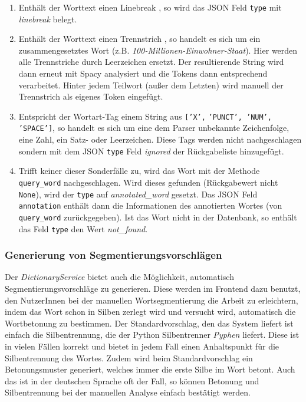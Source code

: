 \begin{itemize}
\begin{enumerate}
	\item Enthält der Worttext einen Linebreak , so wird das JSON Feld \texttt{type} mit \textit{linebreak} belegt.
	
	\item Enthält der Worttext einen Trennstrich \qq{\texttt{-}}, so handelt es sich um ein zusammengesetztes Wort (z.B. \textit{100-Millionen-Einwohner-Staat}). Hier werden alle Trennstriche durch Leerzeichen ersetzt. Der resultierende String wird dann erneut mit Spacy analysiert und die Tokens dann entsprechend verarbeitet. Hinter jedem Teilwort (außer dem Letzten) wird manuell der Trennstrich als eigenes Token eingefügt.
	
	\item Entspricht der Wortart-Tag einem String aus \texttt{['X',} \texttt{'PUNCT', }\texttt{'NUM', }\\
	\texttt{'SPACE']}, so handelt es sich um eine dem Parser unbekannte Zeichenfolge, eine Zahl, ein Satz- oder Leerzeichen. Diese Tags werden nicht nachgeschlagen sondern mit dem JSON \texttt{type} Feld \textit{ignored} der Rückgabeliste hinzugefügt.
	
	\item Trifft keiner dieser Sonderfälle zu, wird das Wort mit der Methode \texttt{query\_word} nachgeschlagen. Wird dieses gefunden (Rückgabewert nicht \texttt{None}), wird der \texttt{type} auf \textit{annotated\_word} gesetzt. Das JSON Feld \texttt{annotation} enthält dann die Informationen des annotierten Wortes (von \texttt{query\_word} zurückgegeben). Ist das Wort nicht in der Datenbank, so enthält das Feld \texttt{type} den Wert \textit{not\_found}.
\end{enumerate}

\end{itemize}

\subsubsection{Generierung von Segmentierungsvorschlägen}
\label{sec:segmentation-proposals}

Der \textit{DictionaryService} bietet auch die Möglichkeit, automatisch Segmentierungsvorschläge zu generieren. Diese werden im Frontend dazu benutzt, den NutzerInnen bei der manuellen Wortsegmentierung die Arbeit zu erleichtern, indem das Wort schon in Silben zerlegt wird und versucht wird, automatisch die Wortbetonung zu bestimmen. Der Standardvorschlag, den das System liefert ist einfach die Silbentrennung, die der Python Silbentrenner \textit{Pyphen} liefert. Diese ist in vielen Fällen korrekt und bietet in jedem Fall einen Anhaltspunkt für die Silbentrennung des Wortes. Zudem wird beim Standardvorschlag ein Betonungsmuster generiert, welches immer die erste Silbe im Wort betont. Auch das ist in der deutschen Sprache oft der Fall, so können Betonung und Silbentrennung bei der manuellen Analyse einfach bestätigt werden.\\

